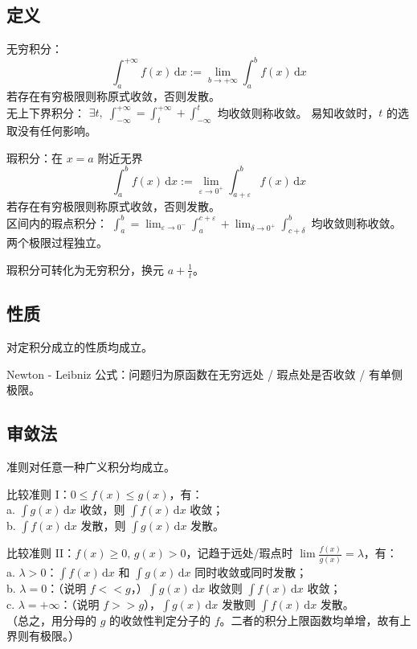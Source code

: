 \documentclass[12pt, a4paper, UTF8, openany]{ctexbook}
\newcommand{\difx}{\,\mathrm{d}x}
\begin{document}
        \subsection{定义}
        无穷积分：$$\int_{a}^{+\infty} f(x)\difx := \lim_{b \to +\infty} \int_{a}^{b} f(x)\difx$$
        若存在{\heiti 有穷}极限则称原式收敛，否则发散。\\
        {\heiti 无上下界积分}：
        $\exists t, \; \int_{-\infty}^{+\infty} = \int_{t}^{+\infty} + \int_{-\infty}^{t}$ {\heiti 均收敛}则称收敛。
        易知收敛时，$t$ 的选取没有任何影响。

        瑕积分：在 $x = a$ 附近无界 
        $$\int_{a}^{b} f(x)\difx := \lim_{\varepsilon \to 0^+} \int_{a + \varepsilon}^{b} f(x)\difx$$
        若存在{\heiti 有穷}极限则称原式收敛，否则发散。\\
        {\heiti 区间内的瑕点积分}：
        $\int_a^b = \lim_{\varepsilon \to 0^-} \int_{a}^{c + \varepsilon} + \lim_{\delta \to 0^+} \int_{c + \delta}^b$ 
        均收敛则称收敛。{\heiti 两个极限过程独立}。

        瑕积分可转化为无穷积分，换元 $a + \frac{1}{t}$。

        \subsection{性质}
        对定积分成立的性质均成立。

        Newton - Leibniz 公式：问题归为原函数在无穷远处 / 瑕点处是否收敛 / 有单侧极限。

        \subsection{审敛法}
        准则对任意一种广义积分均成立。

        比较准则 I：$0 \leqslant f(x) \leqslant g(x)$，有：\\
        a. $\int g(x)\difx$ 收敛，则 $\int f(x)\difx$ 收敛；\\
        b. $\int f(x)\difx$ 发散，则 $\int g(x)\difx$ 发散。

        比较准则 II：$f(x) \geqslant 0, \, g(x) > 0$，记趋于远处/瑕点时 $\lim \frac{f(x)}{g(x)} = \lambda$，有：\\
        a. $\lambda > 0$：$\int f(x)\difx$ 和 $\int g(x)\difx$ 同时收敛或同时发散；\\
        b. $\lambda = 0$：（说明 $f << g$，）$\int g(x)\difx$ 收敛则 $\int f(x)\difx$ 收敛；\\
        c. $\lambda = +\infty$：（说明 $f >> g$），$\int g(x)\difx$ 发散则 $\int f(x)\difx$ 发散。\\
        （总之，用分母的 $g$ 的收敛性判定分子的 $f$。二者的积分上限函数均单增，故有上界则有极限。）
\end{document}
